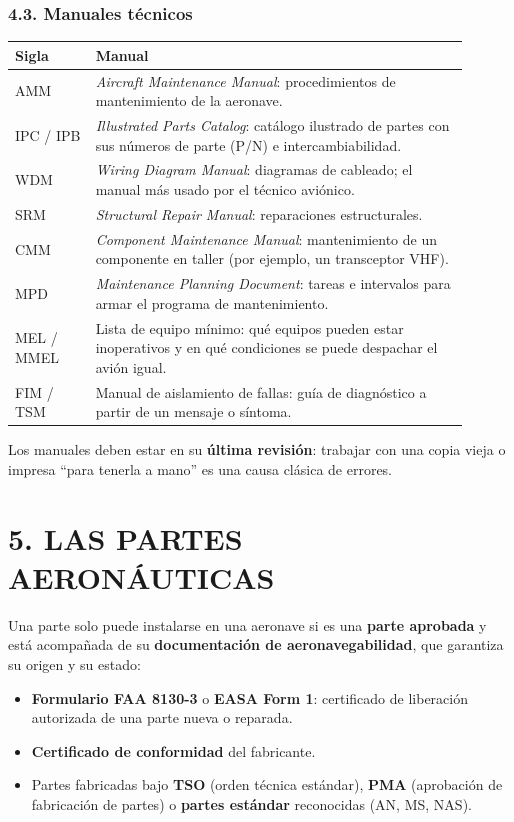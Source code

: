 \subsubsection*{4.3. Manuales técnicos}
\begin{center}
\small
\begin{tabular}{|p{0.16\linewidth}|p{0.74\linewidth}|}
\hline
\textbf{Sigla} & \textbf{Manual} \\ \hline
AMM & \textit{Aircraft Maintenance Manual}: procedimientos de mantenimiento de la aeronave. \\
\hline
IPC / IPB & \textit{Illustrated Parts Catalog}: catálogo ilustrado de partes con sus números de
parte (P/N) e intercambiabilidad. \\ \hline
WDM & \textit{Wiring Diagram Manual}: diagramas de cableado; el manual más usado por el técnico
aviónico. \\ \hline
SRM & \textit{Structural Repair Manual}: reparaciones estructurales. \\ \hline
CMM & \textit{Component Maintenance Manual}: mantenimiento de un componente en taller (por
ejemplo, un transceptor VHF). \\ \hline
MPD & \textit{Maintenance Planning Document}: tareas e intervalos para armar el programa de
mantenimiento. \\ \hline
MEL / MMEL & Lista de equipo mínimo: qué equipos pueden estar inoperativos y en qué condiciones
se puede despachar el avión igual. \\ \hline
FIM / TSM & Manual de aislamiento de fallas: guía de diagnóstico a partir de un mensaje o
síntoma. \\ \hline
\end{tabular}
\end{center}
Los manuales deben estar en su \textbf{última revisión}: trabajar con una copia vieja o
impresa ``para tenerla a mano'' es una causa clásica de errores.

\section*{5. LAS PARTES AERONÁUTICAS}

Una parte solo puede instalarse en una aeronave si es una \textbf{parte aprobada} y está
acompañada de su \textbf{documentación de aeronavegabilidad}, que garantiza su origen y su estado:
\begin{itemize}
  \item \textbf{Formulario FAA 8130-3} o \textbf{EASA Form 1}: certificado de liberación
        autorizada de una parte nueva o reparada.
  \item \textbf{Certificado de conformidad} del fabricante.
  \item Partes fabricadas bajo \textbf{TSO} (orden técnica estándar), \textbf{PMA} (aprobación de
        fabricación de partes) o \textbf{partes estándar} reconocidas (AN, MS, NAS).
\end{itemize}

